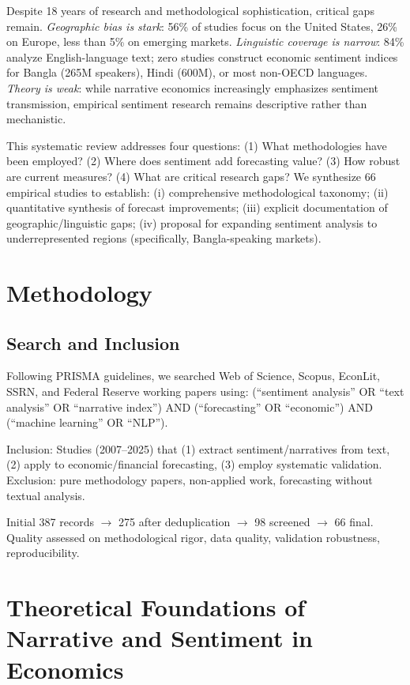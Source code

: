 \documentclass[11pt]{article}
\begin{document}
Despite 18 years of research and methodological sophistication, critical gaps remain. \textit{Geographic bias is stark}: 56\% of studies focus on the United States, 26\% on Europe, less than 5\% on emerging markets. \textit{Linguistic coverage is narrow}: 84\% analyze English-language text; zero studies construct economic sentiment indices for Bangla (265M speakers), Hindi (600M), or most non-OECD languages. \textit{Theory is weak}: while narrative economics increasingly emphasizes sentiment transmission, empirical sentiment research remains descriptive rather than mechanistic.

This systematic review addresses four questions: (1) What methodologies have been employed? (2) Where does sentiment add forecasting value? (3) How robust are current measures? (4) What are critical research gaps? We synthesize 66 empirical studies to establish: (i) comprehensive methodological taxonomy; (ii) quantitative synthesis of forecast improvements; (iii) explicit documentation of geographic/linguistic gaps; (iv) proposal for expanding sentiment analysis to underrepresented regions (specifically, Bangla-speaking markets).

\section{Methodology}

\subsection{Search and Inclusion}

Following PRISMA guidelines, we searched Web of Science, Scopus, EconLit, SSRN, and Federal Reserve working papers using: (``sentiment analysis'' OR ``text analysis'' OR ``narrative index'') AND (``forecasting'' OR ``economic'') AND (``machine learning'' OR ``NLP''). 

Inclusion: Studies (2007--2025) that (1) extract sentiment/narratives from text, (2) apply to economic/financial forecasting, (3) employ systematic validation. Exclusion: pure methodology papers, non-applied work, forecasting without textual analysis.

Initial 387 records $\to$ 275 after deduplication $\to$ 98 screened $\to$ 66 final. Quality assessed on methodological rigor, data quality, validation robustness, reproducibility.

\newpage
\section{Theoretical Foundations of Narrative and Sentiment in Economics}
\end{document}
